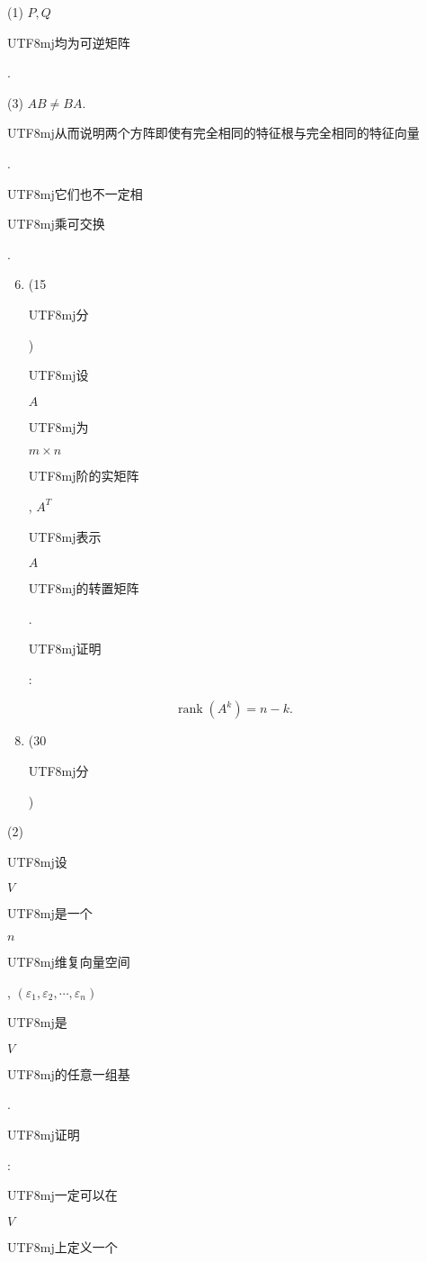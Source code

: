 \documentclass[10pt]{article}
\begin{document}
(1) $P, Q$ \begin{CJK}{UTF8}{mj}均为可逆矩阵\end{CJK}.

(3) $A B \neq B A$. \begin{CJK}{UTF8}{mj}从而说明两个方阵即使有完全相同的特征根与完全相同的特征向量\end{CJK}. \begin{CJK}{UTF8}{mj}它们也不一定相\end{CJK} \begin{CJK}{UTF8}{mj}乘可交换\end{CJK}.

\begin{enumerate}
  \setcounter{enumi}{5}
  \item (15 \begin{CJK}{UTF8}{mj}分\end{CJK}) \begin{CJK}{UTF8}{mj}设\end{CJK} $A$ \begin{CJK}{UTF8}{mj}为\end{CJK} $m \times n$ \begin{CJK}{UTF8}{mj}阶的实矩阵\end{CJK}, $A^{T}$ \begin{CJK}{UTF8}{mj}表示\end{CJK} $A$ \begin{CJK}{UTF8}{mj}的转置矩阵\end{CJK}. \begin{CJK}{UTF8}{mj}证明\end{CJK}:
\end{enumerate}
$$
\operatorname{rank}\left(A^{k}\right)=n-k .
$$

\begin{enumerate}
  \setcounter{enumi}{7}
  \item (30 \begin{CJK}{UTF8}{mj}分\end{CJK})
\end{enumerate}
(2) \begin{CJK}{UTF8}{mj}设\end{CJK} $V$ \begin{CJK}{UTF8}{mj}是一个\end{CJK} $n$ \begin{CJK}{UTF8}{mj}维复向量空间\end{CJK}, $\left(\varepsilon_{1}, \varepsilon_{2}, \cdots, \varepsilon_{n}\right)$ \begin{CJK}{UTF8}{mj}是\end{CJK} $V$ \begin{CJK}{UTF8}{mj}的任意一组基\end{CJK}. \begin{CJK}{UTF8}{mj}证明\end{CJK}: \begin{CJK}{UTF8}{mj}一定可以在\end{CJK} $V$ \begin{CJK}{UTF8}{mj}上定义一个\end{CJK}
\end{document}

